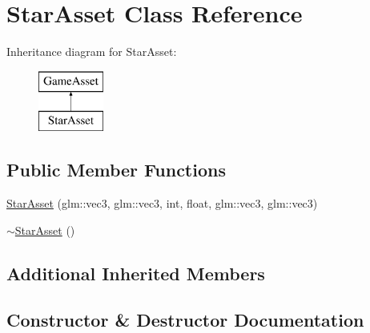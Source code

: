 \hypertarget{classStarAsset}{}\section{Star\+Asset Class Reference}
\label{classStarAsset}
Inheritance diagram for Star\+Asset\+:\begin{figure}[H]
\begin{center}
\leavevmode
\includegraphics[height=2.000000cm]{classStarAsset}
\end{center}
\end{figure}
\subsection*{Public Member Functions}
\begin{DoxyCompactItemize}
\item 
\hyperlink{classStarAsset_a5b0a745ae1ee4fda9067469bf91a4d4a}{Star\+Asset} (glm\+::vec3, glm\+::vec3, int, float, glm\+::vec3, glm\+::vec3)
\item 
\hyperlink{classStarAsset_a77a07269f87ab84c206d1bc5733e0a10}{$\sim$\+Star\+Asset} ()
\end{DoxyCompactItemize}
\subsection*{Additional Inherited Members}


\subsection{Constructor \& Destructor Documentation}
\hypertarget{classStarAsset_a5b0a745ae1ee4fda9067469bf91a4d4a}{}
